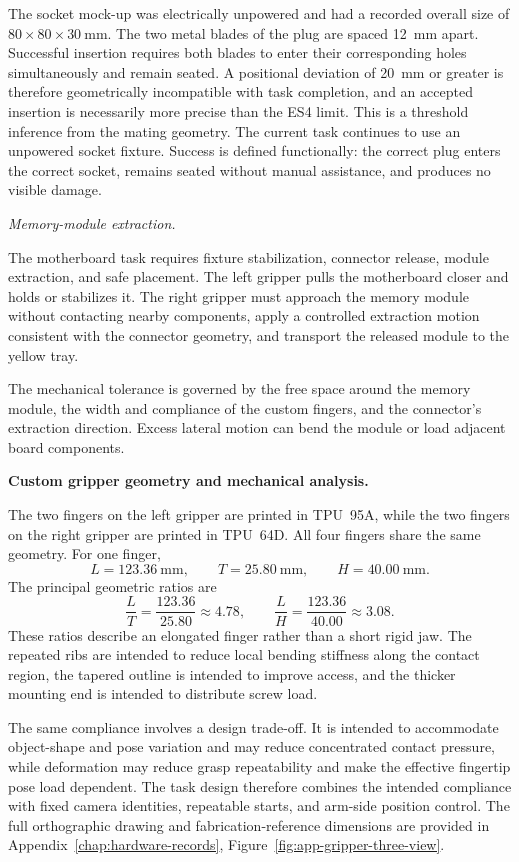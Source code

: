 The socket mock-up was electrically unpowered and had a recorded overall size of \(80\times80\times30~\mathrm{mm}\). The two metal blades of the plug are spaced 12~mm apart. Successful insertion requires both blades to enter their corresponding holes simultaneously and remain seated. A positional deviation of 20~mm or greater is therefore geometrically incompatible with task completion, and an accepted insertion is necessarily more precise than the ES4 limit. This is a threshold inference from the mating geometry. The current task continues to use an unpowered socket fixture. Success is defined functionally: the correct plug enters the correct socket, remains seated without manual assistance, and produces no visible damage.

\smallskip
\noindent\emph{Memory-module extraction.}

The motherboard task requires fixture stabilization, connector release, module extraction, and safe placement. The left gripper pulls the motherboard closer and holds or stabilizes it. The right gripper must approach the memory module without contacting nearby components, apply a controlled extraction motion consistent with the connector geometry, and transport the released module to the yellow tray.

The mechanical tolerance is governed by the free space around the memory module, the width and compliance of the custom fingers, and the connector's extraction direction. Excess lateral motion can bend the module or load adjacent board components.

\medskip
\noindent\textbf{Custom gripper geometry and mechanical analysis.}

The two fingers on the left gripper are printed in TPU~95A, while the two fingers on the right gripper are printed in TPU~64D. All four fingers share the same geometry. For one finger,
\[
L=123.36~\mathrm{mm},\qquad
T=25.80~\mathrm{mm},\qquad
H=40.00~\mathrm{mm}.
\]
The principal geometric ratios are
\begin{equation}
\frac{L}{T}=\frac{123.36}{25.80}\approx4.78,
\qquad
\frac{L}{H}=\frac{123.36}{40.00}\approx3.08.
\label{eq:ch4-finger-ratios}
\end{equation}
These ratios describe an elongated finger rather than a short rigid jaw. The repeated ribs are intended to reduce local bending stiffness along the contact region, the tapered outline is intended to improve access, and the thicker mounting end is intended to distribute screw load.

The same compliance involves a design trade-off. It is intended to accommodate object-shape and pose variation and may reduce concentrated contact pressure, while deformation may reduce grasp repeatability and make the effective fingertip pose load dependent. The task design therefore combines the intended compliance with fixed camera identities, repeatable starts, and arm-side position control. The full orthographic drawing and fabrication-reference dimensions are provided in Appendix~\ref{chap:hardware-records}, Figure~\ref{fig:app-gripper-three-view}.

